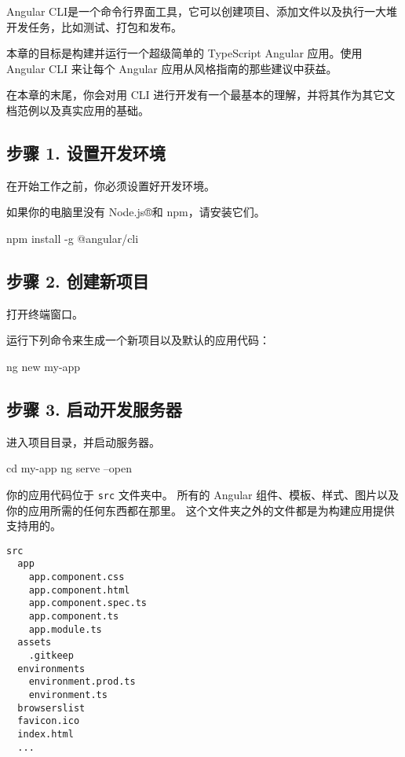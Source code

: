 \documentclass{progartcn}
\begin{document}
Angular CLI是一个命令行界面工具，它可以创建项目、添加文件以及执行一大堆开发任务，比如测试、打包和发布。

本章的目标是构建并运行一个超级简单的 TypeScript Angular 应用。使用 Angular CLI 来让每个 Angular 应用从风格指南的那些建议中获益。

在本章的末尾，你会对用 CLI 进行开发有一个最基本的理解，并将其作为其它文档范例以及真实应用的基础。

\subsection{步骤 1. 设置开发环境}

在开始工作之前，你必须设置好开发环境。

如果你的电脑里没有 Node.js®和 npm，请安装它们。

\begin{invertedshellbox}
npm install -g @angular/cli
\end{invertedshellbox}

\subsection{步骤 2. 创建新项目}

打开终端窗口。

运行下列命令来生成一个新项目以及默认的应用代码：

\begin{invertedshellbox}
ng new my-app
\end{invertedshellbox}

\subsection{步骤 3. 启动开发服务器}

进入项目目录，并启动服务器。

\begin{invertedshellbox}
cd my-app
ng serve --open
\end{invertedshellbox}

你的应用代码位于 \verb|src| 文件夹中。 所有的 Angular 组件、模板、样式、图片以及你的应用所需的任何东西都在那里。 这个文件夹之外的文件都是为构建应用提供支持用的。

\begin{lstlisting}[style=bashoutputstyle]
src
  app
    app.component.css
    app.component.html
    app.component.spec.ts
    app.component.ts
    app.module.ts
  assets
    .gitkeep
  environments
    environment.prod.ts
    environment.ts
  browserslist
  favicon.ico
  index.html
  ...
\end{lstlisting}
\end{document}
